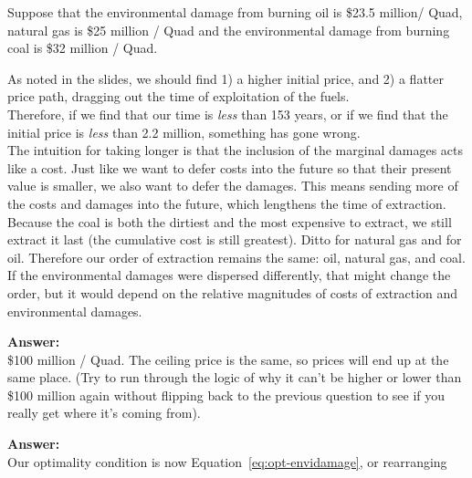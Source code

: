 \begin{enumerate}
\begin{Exercise}{Suppose that the environmental damage from burning oil is \$23.5 million/ Quad, natural gas is \$25 million / Quad and the environmental damage from burning coal is \$32 million / Quad.}
\begin{sol}
        As noted in the slides, we should find 1) a higher initial price, and 2) a flatter price path, dragging out the time of exploitation of the fuels.\\
        
        Therefore, if we find that our time is \textit{less} than 153 years, or if we find that the initial price  is \textit{less} than 2.2 million, something has gone wrong.\\
        
        The intuition for taking longer is that the inclusion of the marginal damages acts like a cost. Just like we want to defer costs into the future so that their present value is smaller, we also want to defer the damages. This means sending more of the costs and damages into the future, which lengthens the time of extraction.\\
        
        Because the coal is both the dirtiest and the most expensive to extract, we still extract it last (the cumulative cost is still greatest). Ditto for natural gas and for oil. Therefore our order of extraction remains the same: oil, natural gas, and coal.\\
        
        If the environmental damages were dispersed differently, that might change the order, but it would depend on the relative magnitudes of costs of extraction and environmental damages.
        

        
        
     \end{sol}

     \begin{sol}
         \textbf{Answer:}\\
        \$100 million / Quad. The ceiling price is the same, so prices will end up at the same place. (Try to run through the logic of why it can't be higher or lower than \$100 million again without flipping back to the previous question to see if you really get where it's coming from).     
    \end{sol}
    
    
     \begin{sol}
         \textbf{Answer:}\\
         Our optimality condition is now Equation~\eqref{eq:opt-envidamage}, or rearranging
         

\end{sol}
\end{Exercise}
\end{enumerate}
